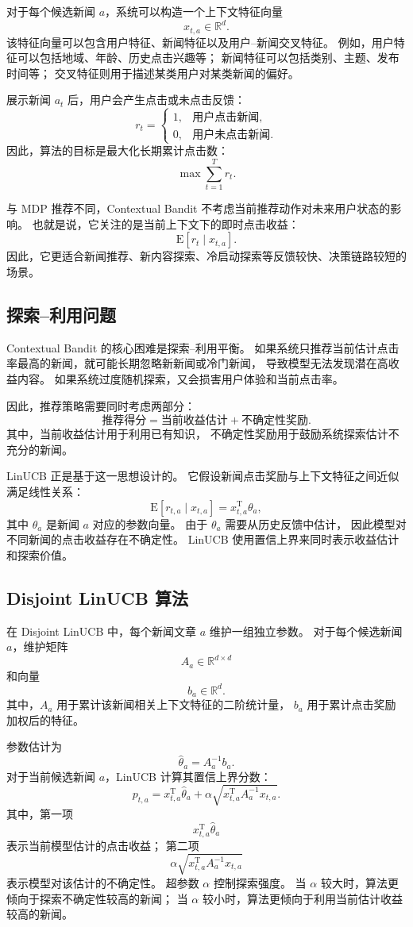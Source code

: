 \documentclass[11pt]{ctexart}
\begin{document}
对于每个候选新闻 $a$，系统可以构造一个上下文特征向量
\[
x_{t,a}\in\mathbb{R}^{d}.
\]
该特征向量可以包含用户特征、新闻特征以及用户--新闻交叉特征。
例如，用户特征可以包括地域、年龄、历史点击兴趣等；
新闻特征可以包括类别、主题、发布时间等；
交叉特征则用于描述某类用户对某类新闻的偏好。

展示新闻 $a_t$ 后，用户会产生点击或未点击反馈：
\[
r_t=
\begin{cases}
1, & \text{用户点击新闻},\\
0, & \text{用户未点击新闻}.
\end{cases}
\]
因此，算法的目标是最大化长期累计点击数：
\[
\max \sum_{t=1}^{T} r_t.
\]

与 MDP 推荐不同，Contextual Bandit 不考虑当前推荐动作对未来用户状态的影响。
也就是说，它关注的是当前上下文下的即时点击收益：
\[
\mathrm{E}[r_t\mid x_{t,a}].
\]
因此，它更适合新闻推荐、新内容探索、冷启动探索等反馈较快、决策链路较短的场景。

\subsection{探索--利用问题}

Contextual Bandit 的核心困难是探索--利用平衡。
如果系统只推荐当前估计点击率最高的新闻，就可能长期忽略新新闻或冷门新闻，
导致模型无法发现潜在高收益内容。
如果系统过度随机探索，又会损害用户体验和当前点击率。

因此，推荐策略需要同时考虑两部分：
\[
\text{推荐得分}
=
\text{当前收益估计}
+
\text{不确定性奖励}.
\]
其中，当前收益估计用于利用已有知识，
不确定性奖励用于鼓励系统探索估计不充分的新闻。

LinUCB 正是基于这一思想设计的。
它假设新闻点击奖励与上下文特征之间近似满足线性关系：
\[
\mathrm{E}[r_{t,a}\mid x_{t,a}]
=
x_{t,a}^{\mathrm{T}}\theta_a,
\]
其中 $\theta_a$ 是新闻 $a$ 对应的参数向量。
由于 $\theta_a$ 需要从历史反馈中估计，
因此模型对不同新闻的点击收益存在不确定性。
LinUCB 使用置信上界来同时表示收益估计和探索价值。

\subsection{Disjoint LinUCB 算法}

在 Disjoint LinUCB 中，每个新闻文章 $a$ 维护一组独立参数。
对于每个候选新闻 $a$，维护矩阵
\[
A_a\in\mathbb{R}^{d\times d}
\]
和向量
\[
b_a\in\mathbb{R}^{d}.
\]
其中，$A_a$ 用于累计该新闻相关上下文特征的二阶统计量，
$b_a$ 用于累计点击奖励加权后的特征。

参数估计为
\[
\hat{\theta}_a=A_a^{-1}b_a.
\]
对于当前候选新闻 $a$，LinUCB 计算其置信上界分数：
\[
p_{t,a}
=
x_{t,a}^{\mathrm{T}}\hat{\theta}_a
+
\alpha
\sqrt{
x_{t,a}^{\mathrm{T}}A_a^{-1}x_{t,a}
}.
\]
其中，第一项
\[
x_{t,a}^{\mathrm{T}}\hat{\theta}_a
\]
表示当前模型估计的点击收益；
第二项
\[
\alpha
\sqrt{
x_{t,a}^{\mathrm{T}}A_a^{-1}x_{t,a}
}
\]
表示模型对该估计的不确定性。
超参数 $\alpha$ 控制探索强度。
当 $\alpha$ 较大时，算法更倾向于探索不确定性较高的新闻；
当 $\alpha$ 较小时，算法更倾向于利用当前估计收益较高的新闻。
\end{document}
